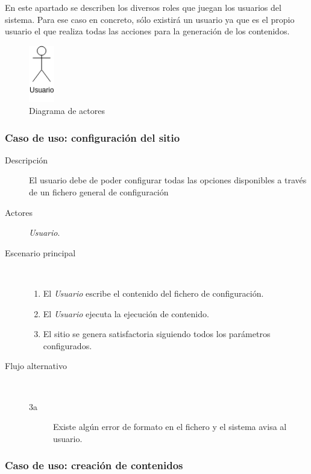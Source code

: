En este apartado se describen los diversos roles que juegan los usuarios del sistema.
Para ese caso en concreto, sólo existirá un usuario ya que es el propio usuario
el que realiza todas las acciones para la generación de los contenidos.

\begin{figure}[h]
    \centering
    \includegraphics[width=0.1\textwidth]{4_analisis/actor}
    \caption{Diagrama de actores}
    \label{fig:actores}
\end{figure}

\subsubsection{Caso de uso: configuración del sitio}

\begin{description}
    \item[Descripción] El usuario debe de poder configurar todas las opciones disponibles
        a través de un fichero general de configuración
    \item[Actores] \textit{Usuario}.
    \item[Escenario principal] $\quad$
        \begin{enumerate}
            \item El \textit{Usuario} escribe el contenido del fichero de configuración.
            \item El \textit{Usuario} ejecuta la ejecución de contenido.
            \item El sitio se genera satisfactoria siguiendo todos los parámetros configurados.
        \end{enumerate}
    \item[Flujo alternativo] $\quad$
        \begin{description}
            \item[3a] Existe algún error de formato en el fichero y el sistema avisa al usuario.
        \end{description}
\end{description}

\subsubsection{Caso de uso: creación de contenidos}

